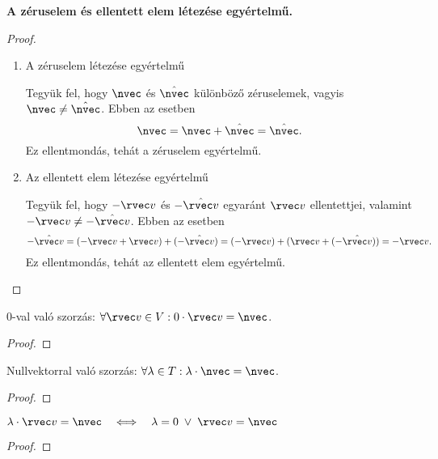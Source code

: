 \begin{statement}
  \textbf{A zéruselem és ellentett elem létezése egyértelmű.}

  \begin{proof}
    \begin{enumerate}
      \item {\sffamily A zéruselem létezése egyértelmű}

            Tegyük fel, hogy $\nvec$ és $\hat \nvec$ különböző
            zéruselemek, vagyis $\nvec \neq \hat \nvec$. Ebben az esetben
            $$
              \nvec = \nvec + \hat \nvec = \hat \nvec
              \text.
            $$
            Ez ellentmondás, tehát a zéruselem egyértelmű.

            \bigskip

      \item {\sffamily Az ellentett elem létezése egyértelmű}

            Tegyük fel, hogy $-\rvec v$ és $-\hat{\rvec v}$ egyaránt
            $\rvec v$ ellentettjei, valamint $-\rvec v \neq -\hat{\rvec v}$.
            Ebben az esetben
            $$
              -\hat{\rvec v}
              = (-\rvec v + \rvec v) + (-\hat{\rvec v})
              = (-\rvec v) + (\rvec v + (-\hat{\rvec v}))
              = -\rvec v
              \text.
            $$
            Ez ellentmondás, tehát az ellentett elem egyértelmű.
    \end{enumerate}
  \end{proof}
\end{statement}

\begin{statement}
  0-val való szorzás:
  $\forall \rvec v \in V: 0 \cdot \rvec v = \nvec$.

  \begin{proof}
    \vspace{3em}
  \end{proof}
\end{statement}

\begin{statement}
  Nullvektorral való szorzás:
  $\forall \lambda \in T: \lambda \cdot \nvec = \nvec$.

  \begin{proof}
    \vspace{3em}
  \end{proof}
\end{statement}

\begin{statement}
  $\lambda \cdot \rvec v = \nvec \quad \Longleftrightarrow \quad
    \lambda = 0 \; \lor \; \rvec v = \nvec$

  \begin{proof}
    \vspace{3em}
  \end{proof}
\end{statement}

